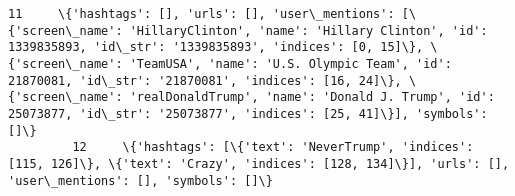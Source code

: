 \documentclass[11pt]{article}
\begin{document}
\begin{Verbatim}[commandchars=\\\{\}]
         11     \{'hashtags': [], 'urls': [], 'user\_mentions': [\{'screen\_name': 'HillaryClinton', 'name': 'Hillary Clinton', 'id': 1339835893, 'id\_str': '1339835893', 'indices': [0, 15]\}, \{'screen\_name': 'TeamUSA', 'name': 'U.S. Olympic Team', 'id': 21870081, 'id\_str': '21870081', 'indices': [16, 24]\}, \{'screen\_name': 'realDonaldTrump', 'name': 'Donald J. Trump', 'id': 25073877, 'id\_str': '25073877', 'indices': [25, 41]\}], 'symbols': []\}                                                                                                                                                                                                                                                                                                                                                                                                                                                                                                                                                                                                                                                                                                                                                                       
         12     \{'hashtags': [\{'text': 'NeverTrump', 'indices': [115, 126]\}, \{'text': 'Crazy', 'indices': [128, 134]\}], 'urls': [], 'user\_mentions': [], 'symbols': []\}                                                                                                                                                                                                                                                                                                                                                                                                                                                                                                                                                                                                                                                                                                                                                                                                                                                                                                                                                                                                                                                        

\end{Verbatim}
\end{document}
